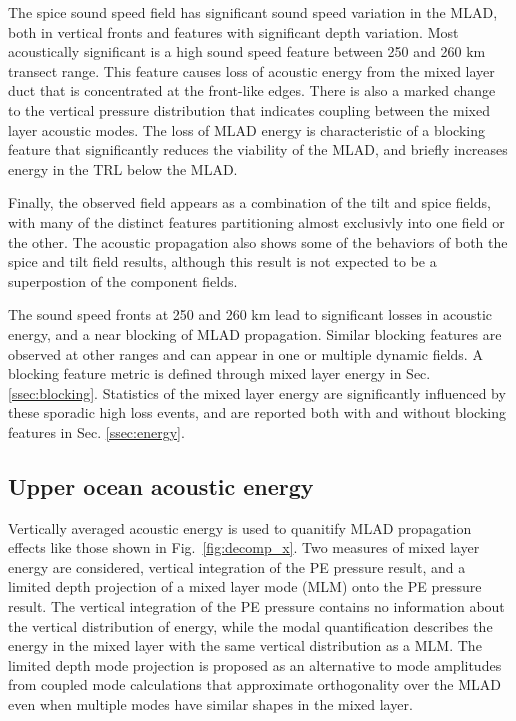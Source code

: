 \documentclass[preprint,NumberedRefs]{JASA}
\begin{document}
The spice sound speed field has significant sound speed variation in the MLAD, both in vertical fronts and features with significant depth variation. Most acoustically significant is a high sound speed feature between 250 and 260 km transect range. This feature causes loss of acoustic energy from the mixed layer duct that is concentrated at the front-like edges. There is also a marked change to the vertical pressure distribution that indicates coupling between the mixed layer acoustic modes. The loss of MLAD energy is characteristic of a blocking feature that significantly reduces the viability of the MLAD, and briefly increases energy in the TRL below the MLAD.

Finally, the observed field appears as a combination of the tilt and spice fields, with many of the distinct features partitioning almost exclusivly into one field or the other. The acoustic propagation also shows some of the behaviors of both the spice and tilt field results, although this result is not expected to be a superpostion of the component fields.

The sound speed fronts at 250 and 260 km lead to significant losses in acoustic energy, and a near blocking of MLAD propagation. Similar blocking features are observed at other ranges and can appear in one or multiple dynamic fields. A blocking feature metric is defined through mixed layer energy in Sec. \ref{ssec:blocking}. Statistics of the mixed layer energy are significantly influenced by these sporadic high loss events, and are reported both with and without blocking features in Sec. \ref{ssec:energy}.

\subsection{Upper ocean acoustic energy}\label{ssec:bg}
Vertically averaged acoustic energy is used to quanitify MLAD propagation effects like those shown in Fig.~\ref{fig:decomp_x}. Two measures of mixed layer energy are considered, vertical integration of the PE pressure result, and a limited depth projection of a mixed layer mode (MLM) onto the PE pressure result. The vertical integration of the PE pressure contains no information about the vertical distribution of energy, while the modal quantification describes the energy in the mixed layer with the same vertical distribution as a MLM. The limited depth mode projection is proposed as an alternative to mode amplitudes from coupled mode calculations that approximate orthogonality over the MLAD even when multiple modes have similar shapes in the mixed layer.
\end{document}
